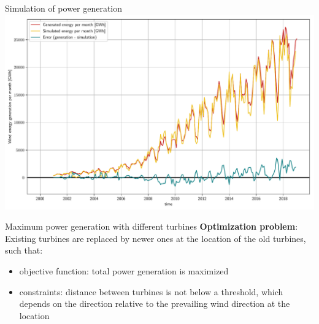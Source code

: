 \documentclass[color=usenames,dvipsnames]{beamer}
\begin{document}
    \begin{frame}{Simulation of power generation}
        \includegraphics[width=\textwidth]{../../figures/simulated-energy_time-series.pdf}
    \end{frame}


    \begin{frame}{Maximum power generation with different turbines}
        \textbf{Optimization problem}:\\
        \bigskip
        Existing turbines are replaced by newer ones at the location of the old
        turbines, such that:\\
        \begin{itemize}
            \item objective function: total power generation is maximized
            \item constraints: distance between turbines is not below a threshold\pause ,
                which depends on the direction relative to the prevailing wind direction
                at the location
        \end{itemize}
    \end{frame}


\end{document}
